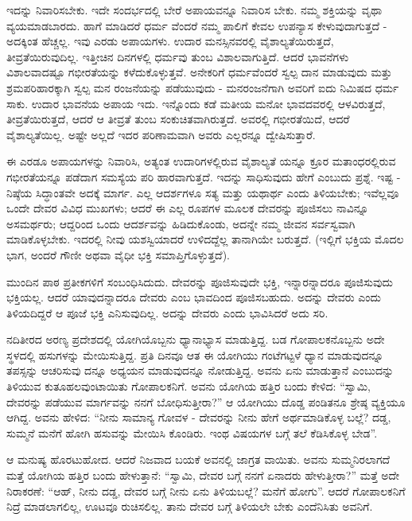 ಇದನ್ನು ನಿವಾರಿಸಬೇಕು. ಇದೇ ಸಂದರ್ಭದಲ್ಲಿ ಬೇರೆ ಅಪಾಯವನ್ನೂ ನಿವಾರಿಸ ಬೇಕು. ನಮ್ಮ ಶಕ್ತಿಯನ್ನು ವೃಥಾ ವ್ಯಯಮಾಡಬಾರದು. ಹಾಗೆ ಮಾಡಿದರೆ ಧರ್ಮ ವೆಂದರೆ ನಮ್ಮ ಪಾಲಿಗೆ ಕೇವಲ ಉಪನ್ಯಾಸ ಕೇಳುವುದಾಗುತ್ತದೆ - ಅದಕ್ಕಿಂತ ಹೆಚ್ಚಲ್ಲ. ಇವು ಎರಡು ಅಪಾಯಗಳು. ಉದಾರ ಮನಸ್ಸಿನವರಲ್ಲಿ ವೈಶಾಲ್ಯತೆಯಿರುತ್ತದೆ, ತೀವ್ರತೆಯಿರುವುದಿಲ್ಲ. ಇತ್ತೀಚಿನ ದಿನಗಳಲ್ಲಿ ಧರ್ಮವು ತುಂಬ ವಿಶಾಲವಾಗುತ್ತಿದೆ. ಆದರೆ ಭಾವನೆಗಳು ವಿಶಾಲವಾದಷ್ಟೂ ಗಭೀರತೆಯನ್ನು ಕಳೆದುಕೊಳ್ಳುತ್ತವೆ. ಅನೇಕರಿಗೆ ಧರ್ಮವೆಂದರೆ ಸ್ವಲ್ಪ ದಾನ ಮಾಡುವುದು ಮತ್ತು ಶ್ರಮಪರಿಹಾರಕ್ಕಾಗಿ ಸ್ವಲ್ಪ ಮನ ರಂಜನೆಯನ್ನು ಪಡೆಯುವುದು - ಮನರಂಜನೆಗಾಗಿ ಅವರಿಗೆ ಐದು ನಿಮಿಷದ ಧರ್ಮ ಸಾಕು. ಉದಾರ ಭಾವನೆಯ ಅಪಾಯ ಇದು. ಇನ್ನೊಂದು ಕಡೆ ಮತೀಯ ಮನೋ ಭಾವದವರಲ್ಲಿ ಆಳವಿರುತ್ತದೆ, ತೀವ್ರತೆಯಿರುತ್ತದೆ, ಆದರೆ ಆ ತೀವ್ರತೆ ತುಂಬ ಸಂಕುಚಿತವಾಗಿರುತ್ತದೆ. ಅವರಲ್ಲಿ ಗಭೀರತೆಯಿದೆ, ಆದರೆ ವೈಶಾಲ್ಯತೆಯಿಲ್ಲ. ಅಷ್ಟೇ ಅಲ್ಲದೆ ಇದರ ಪರಿಣಾಮವಾಗಿ ಅವರು ಎಲ್ಲರನ್ನೂ ದ್ವೇಷಿಸುತ್ತಾರೆ.

ಈ ಎರಡೂ ಅಪಾಯಗಳನ್ನು ನಿವಾರಿಸಿ, ಅತ್ಯಂತ ಉದಾರಿಗಳಲ್ಲಿರುವ ವೈಶಾಲ್ಯತೆ ಯನ್ನೂ ಕ್ರೂರ ಮತಾಂಧರಲ್ಲಿರುವ ಗಭೀರತೆಯನ್ನೂ ಪಡೆದಾಗ ಸಮಸ್ಯೆಯ ಪರಿ ಹಾರವಾಗುತ್ತದೆ. ಇದನ್ನು ಸಾಧಿಸುವುದು ಹೇಗೆ ಎಂಬುದು ಪ್ರಶ್ನೆ. ಇಷ್ಟ - ನಿಷ್ಠೆಯ ಸಿದ್ಧಾಂತವೇ ಅದಕ್ಕೆ ಮಾರ್ಗ. ಎಲ್ಲ ಆದರ್ಶಗಳೂ ಸತ್ಯ ಮತ್ತು ಯಥಾರ್ಥ ಎಂದು ತಿಳಿಯಬೇಕು; ಇವೆಲ್ಲವೂ ಒಂದೇ ದೇವರ ವಿವಿಧ ಮುಖಗಳು; ಆದರೆ ಈ ಎಲ್ಲ ರೂಪಗಳ ಮೂಲಕ ದೇವರನ್ನು ಪೂಜಿಸಲು ನಾವಿನ್ನೂ ಅಸಮರ್ಥರು; ಆದ್ದರಿಂದ ಒಂದು ಆದರ್ಶವನ್ನು ಹಿಡಿದುಕೊಂಡು, ಅದನ್ನೇ ನಮ್ಮ ಜೀವನ ಸರ್ವಸ್ವವಾಗಿ ಮಾಡಿಕೊಳ್ಳಬೇಕು. ಇದರಲ್ಲಿ ನೀವು ಯಶಸ್ವಿಯಾದರೆ ಉಳಿದದ್ದೆಲ್ಲ ತಾನಾಗಿಯೇ ಬರುತ್ತದೆ. (ಇಲ್ಲಿಗೆ ಭಕ್ತಿಯ ಮೊದಲ ಭಾಗ, ಅಂದರೆ ಗೌಣೀ ಅಥವಾ ವೈಧೀ ಭಕ್ತಿ ಸಮಾಪ್ತಿಗೊಳ್ಳುತ್ತದೆ).

ಮುಂದಿನ ಪಾಠ ಪ್ರತೀಕಗಳಿಗೆ ಸಂಬಂಧಿಸಿದುದು. ದೇವರನ್ನು ಪೂಜಿಸುವುದೇ ಭಕ್ತಿ, ಇನ್ನಾರನ್ನಾದರೂ ಪೂಜಿಸುವುದು ಭಕ್ತಿಯಲ್ಲ. ಆದರೆ ಯಾವುದನ್ನಾದರೂ ದೇವರು ಎಂಬ ಭಾವದಿಂದ ಪೂಜಿಸಬಹುದು. ಅದನ್ನು ದೇವರು ಎಂದು ತಿಳಿಯದಿದ್ದರೆ ಆ ಪೂಜೆ ಭಕ್ತಿ ಎನಿಸುವುದಿಲ್ಲ. ಅದನ್ನು ದೇವರು ಎಂದು ಭಾವಿಸಿದರೆ ಅದು ಸರಿ.

ನದಿತೀರದ ಅರಣ್ಯ ಪ್ರದೇಶದಲ್ಲಿ ಯೋಗಿಯೊಬ್ಬನು ಧ್ಯಾನಾಭ್ಯಾಸ ಮಾಡುತ್ತಿದ್ದ. ಬಡ ಗೋಪಾಲಕನೊಬ್ಬನು ಅದೇ ಸ್ಥಳದಲ್ಲಿ ಹಸುಗಳನ್ನು ಮೇಯಿಸುತ್ತಿದ್ದ. ಪ್ರತಿ ದಿನವೂ ಆತ ಈ ಯೋಗಿಯು ಗಂಟೆಗಟ್ಟಳೆ ಧ್ಯಾನ ಮಾಡುವುದನ್ನೂ ತಪಸ್ಸನ್ನು ಆಚರಿಸುವು ದನ್ನೂ ಅಧ್ಯಯನ ಮಾಡುವುದನ್ನೂ ನೋಡುತ್ತಿದ್ದ. ಅವನು ಏನು ಮಾಡುತ್ತಾನೆ ಎಂಬುದನ್ನು ತಿಳಿಯುವ ಕುತೂಹಲವುಂಟಾಯಿತು ಗೋಪಾಲಕನಿಗೆ. ಅವನು ಯೋಗಿಯ ಹತ್ತಿರ ಬಂದು ಕೇಳಿದ: “ಸ್ವಾಮಿ, ದೇವರನ್ನು ಪಡೆಯುವ ಮಾರ್ಗವನ್ನು ನನಗೆ ಬೋಧಿಸುತ್ತೀರಾ?” ಆ ಯೋಗಿಯು ದೊಡ್ಡ ಪಂಡಿತನೂ ಶ್ರೇಷ್ಠ ವ್ಯಕ್ತಿಯೂ ಆಗಿದ್ದ. ಅವನು ಹೇಳಿದ: “ನೀನು ಸಾಮಾನ್ಯ ಗೋವಳ - ದೇವರನ್ನು ನೀನು ಹೇಗೆ ಅರ್ಥಮಾಡಿಕೊಳ್ಳ ಬಲ್ಲೆ? ದಡ್ಡ, ಸುಮ್ಮನೆ ಮನೆಗೆ ಹೋಗಿ ಹಸುವನ್ನು ಮೇಯಿಸಿ ಕೊಂಡಿರು. ಇಂಥ ವಿಷಯಗಳ ಬಗ್ಗೆ ತಲೆ ಕೆಡಿಸಿಕೊಳ್ಳ ಬೇಡ”.

ಆ ಮನುಷ್ಯ ಹೊರಟುಹೋದ. ಆದರೆ ನಿಜವಾದ ಬಯಕೆ ಅವನಲ್ಲಿ ಜಾಗ್ರತ ವಾಯಿತು. ಅವನು ಸುಮ್ಮನಿರಲಾಗದೆ ಮತ್ತೆ ಯೋಗಿಯ ಹತ್ತಿರ ಬಂದು ಹೇಳುತ್ತಾನೆ: “ಸ್ವಾಮಿ, ದೇವರ ಬಗ್ಗೆ ನನಗೆ ಏನಾದರು ಹೇಳುತ್ತೀರಾ?” ಮತ್ತೆ ಅದೇ ನಿರಾಕರಣೆ: “ಆಹ್, ನೀನು ದಡ್ಡ, ದೇವರ ಬಗ್ಗೆ ನೀನು ಏನು ತಿಳಿಯಬಲ್ಲೆ? ಮನೆಗೆ ಹೋಗು”. ಆದರೆ ಗೋಪಾಲಕನಿಗೆ ನಿದ್ರೆ ಮಾಡಲಾಗಲಿಲ್ಲ, ಊಟವೂ ರುಚಿಸಲಿಲ್ಲ. ತಾನು ದೇವರ ಬಗ್ಗೆ ತಿಳಿಯಲೇ ಬೇಕು ಎಂದೆನಿಸಿತು ಅವನಿಗೆ.

